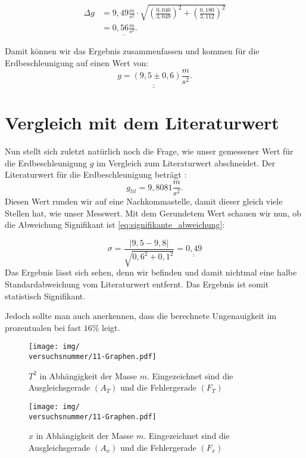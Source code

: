 \begin{align}
    \Delta g &= 9,49 \frac{m}{s^2} \cdot \sqrt{\left(\frac{0,040}{3,049}\right)^2 + \left(\frac{0,180}{3,112}\right)^2} \\
    & = \underline{0,56 \frac{m}{s^2}}.
\end{align}


Damit können wir das Ergebnis zusammenfassen und kommen für die Erdbeschleunigung auf einen Wert von:
\begin{equation}
    \underline{\underline{g = (9,5 \pm 0,6) \frac{m}{s^2}}}.
\end{equation}

\section{Vergleich mit dem Literaturwert} 

Nun stellt sich zuletzt natürlich noch die Frage, wie unser gemessener Wert für die Erdbeschleunigung $g$ im Vergleich zum Literaturwert abschneidet. Der Literaturwert für die Erdbeschleunigung beträgt \cite{wikipedia-erdbeschleunigung}:
\begin{equation}
    g_{lit} = 9,8081 \frac{m}{s^2}.
\end{equation}
Diesen Wert runden wir auf eine Nachkommastelle, damit dieser gleich viele Stellen hat, wie unser Messwert. 
Mit dem Gerundetem Wert schauen wir nun, ob die Abweichung Signifikant ist \eqref{eq:signifikante_abweichung}:

\begin{equation}
    \sigma = \frac{\left| 9,5 - 9,8 \right|}{\sqrt{0,6^2 + 0,1^2}} = \underline{\underline{0,49}}
\end{equation}
Das Ergebnis lässt sich sehen, denn wir befinden und damit nichtmal eine halbe Standardabweichung vom Literaturwert entfernt. Das Ergebnis ist somit statistisch Signifikant.

Jedoch sollte man auch anerkennen, dass die berechnete Ungenauigkeit im prozentualen bei fast $16\%$ leigt. 


\newpage
\onecolumn
\begin{figure}
    \texttt{[image: img/\\versuchsnummer/11-Graphen.pdf]}
    \caption{$T^2$ in Abhängigkeit der Masse $m$. Eingezeichnet sind die Ausgleichsgerade $(A_T)$ und die Fehlergerade $(F_T)$}
    \label{fig:geraden_federkosntante}
\end{figure}

\begin{figure}
    \texttt{[image: img/\\versuchsnummer/11-Graphen.pdf]}
    \caption{$x$ in Abhängigkeit der Masse $m$. Eingezeichnet sind die Ausgleichsgerade $(A_x)$ und die Fehlergerade $(F_x)$}
    \label{fig:plot_masse_gegen_auslenkung}
\end{figure}

\twocolumn
